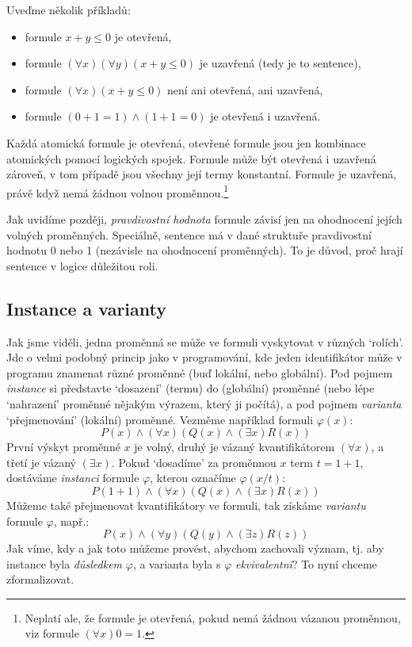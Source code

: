 \begin{example} Uveďme několik příkladů:
    \begin{itemize}
        \item formule $x+y\leq 0$ je otevřená,
        \item formule $(\forall x)(\forall y)(x+y\leq 0)$ je uzavřená (tedy je to sentence),
        \item formule $(\forall x)(x+y\leq 0)$ není ani otevřená, ani uzavřená,
        \item formule $(0+1=1)\land (1+1=0)$ je otevřená i uzavřená. 
    \end{itemize}
\end{example}

Každá atomická formule je otevřená, otevřené formule jsou jen kombinace atomických pomocí logických spojek. Formule může být otevřená i uzavřená zároveň, v tom případě jsou všechny její termy konstantní. Formule je uzavřená, právě když nemá žádnou volnou proměnnou.\footnote{Neplatí ale, že formule je otevřená, pokud nemá žádnou vázanou proměnnou, viz formule $(\forall x)0=1$.}

\begin{remark}
Jak uvidíme později, \emph{pravdivostní hodnota} formule závisí jen na ohodnocení jejích volných proměnných. Speciálně, sentence má v dané struktuře pravdivostní hodnotu 0 nebo 1 (nezávisle na ohodnocení proměnných). To je důvod, proč hrají sentence v logice důležitou roli.
\end{remark}

\subsection{Instance a varianty}

Jak jsme viděli, jedna proměnná se může ve formuli vyskytovat v různých `rolích'. Jde o velmi podobný princip jako v programování, kde jeden identifikátor může v programu znamenat různé proměnné (buď lokální, nebo globální). Pod pojmem \emph{instance} si představte `dosazení' (termu) do (globální) proměnné (nebo lépe `nahrazení' proměnné nějakým výrazem, který ji počítá), a pod pojmem \emph{varianta} `přejmenování' (lokální) proměnné. Vezměme například formuli $\varphi(x)$:
$$
P(x)\land (\forall x)(Q(x) \land (\exists x)R(x))
$$
První výskyt proměnné $x$ je volný, druhý je vázaný kvantifikátorem $(\forall x)$, a třetí je vázaný  $(\exists x)$. Pokud `dosadíme' za proměnnou $x$ term $t=1+1$, dostáváme \emph{instanci} formule $\varphi$, kterou označíme $\varphi(x/t)$:
$$
P(1+1)\land (\forall x)(Q(x) \land (\exists x)R(x))
$$
Můžeme také přejmenovat kvantifikátory ve formuli, tak získáme \emph{variantu} formule $\varphi$, např.:
$$
P(x)\land (\forall y)(Q(y) \land (\exists z)R(z))
$$
Jak víme, kdy a jak toto můžeme provést, abychom zachovali význam, tj. aby instance byla \emph{důsledkem} $\varphi$, a varianta byla s $\varphi$ \emph{ekvivalentní}? To nyní chceme zformalizovat.

